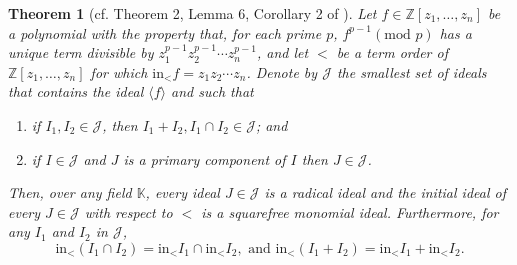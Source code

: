 \documentclass[10pt]{amsart}
\numberwithin{equation}{section}
\newtheorem{thm}{Theorem}[section]
\theoremstyle{definition}
\theoremstyle{remark}
\newcommand{\1}{^{-1}}
\begin{document}




\begin{thm}[cf. Theorem 2, Lemma 6, Corollary 2 of \cite{Knu09}]
\label{thm:Knutson}
Let $f \in \mathbb{Z}[z_{1}, \ldots, z_{n}]$ be a polynomial with the property that, for each prime $p$, $f^{p-1} (\text{mod }p)$ has a unique term divisible by $z_1^{p-1}z_2^{p-1}\cdots z_n^{p-1}$, and let $<$ be a term order of $\mathbb{Z}[z_1,\dots,z_n]$ for which $\textrm{in}_<f = z_1z_2\cdots z_n$.
Denote by $\mathcal{J}$ the smallest set of ideals that contains the ideal $\langle f \rangle$
and such that 
\begin{enumerate}
\item  if $I_{1}, I_{2} \in \mathcal{J}$, then $I_{1} + I_{2}, I_{1} \cap I_{2} \in \mathcal{J}$; and
\item  if $I \in \mathcal{J}$ and $J$ is a primary component of $I$ then
$J \in \mathcal{J}$.
\end{enumerate}
Then, over any field $\mathbb{K}$, every ideal $J \in \mathcal{J}$ is a radical ideal and
the initial ideal of every $J \in \mathcal{J}$ with respect to $<$ is a squarefree monomial ideal.
Furthermore, for any $I_1$ and $I_2$ in  $\mathcal{J}$,
\[\textrm{in}_<(I_1\cap I_2) = \textrm{in}_< I_1 \cap \textrm{in}_< I_2,\textrm{ and }\textrm{in}_<(I_1+I_2) = \textrm{in}_< I_1+\textrm{in}_< I_2.\]
\end{thm}
\end{document}
